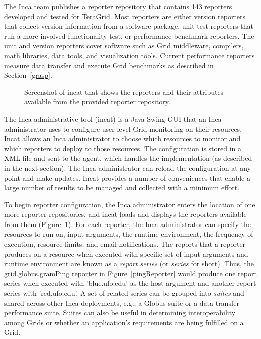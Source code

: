 \documentclass[times,10pt,twocolumn]{article}
\begin{document}
The Inca team publishes a reporter repository that contains 143 reporters
developed and tested for TeraGrid.  Most reporters are either version
reporters that collect version information from a software package,
unit test reporters that run a more involved
functionality test, or performance benchmark reporters.  The unit and version
reporters cover software such as Grid middleware, compilers, math libraries,
data tools, and visualization tools.  Current performance reporters
measure data transfer and execute Grid benchmarks as described in
Section~\ref{grasp}.


\begin{figure}[tbp]
  \centering
  \mbox{}
  \caption{\label{incat_fig} Screenshot of incat that shows the reporters
  and their attributes available from the provided reporter repository.}
\end{figure}

The Inca administrative tool (incat) is a Java Swing GUI that an
Inca administrator uses to configure user-level Grid monitoring on their
resources.  Incat allows an Inca administrator to choose which resources to
monitor and which reporters to deploy to those resources.  The configuration
is stored in a XML file and sent to the agent, which handles the implementation
(as described in the next section).  The Inca administrator can reload the
configuration at any point and make updates.  Incat provides a number of
conveniences that enable a large number of results to be managed and collected
with a minimum effort.  

To begin reporter configuration, the Inca administrator enters the location of
one more reporter repositories, and incat loads and displays the reporters
available from them (Figure~\ref{incat_fig}).
For each reporter, the Inca administrator can specify the resources to run on,
input arguments, the runtime environment, the frequency of execution, resource
limits, and email notifications.  The reports that a reporter produces on a
resource when executed with specific set of input arguments and runtime
environment are known as a \emph{report series} (or \emph{series} for short).
Thus, the grid.globus.gramPing reporter in Figure~\ref{pingReporter} would
produce one report series when executed with 'blue.ufo.edu' as the host argument and another report series with 'red.ufo.edu'.  A set of related
series can be grouped into \emph{suites} and shared across other Inca
deployments, e.g.,  a Globus suite or a data transfer
performance suite.  Suites can also be useful in determining interoperability
among Grids or whether an application's requirements are being
fulfilled on a Grid.
\end{document}
